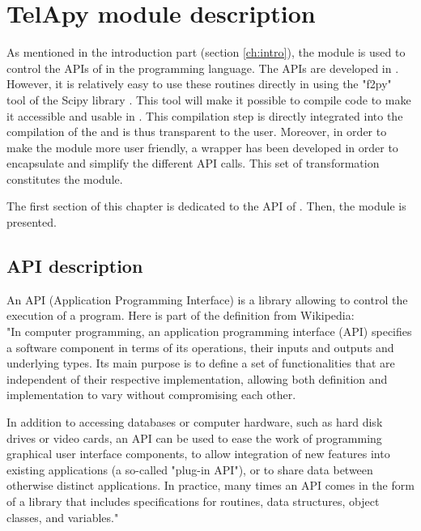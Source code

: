 \chapter{  TelApy module description}
\label{ch:TelApy_description}

As mentioned in the introduction part (section \ref{ch:intro}), the \TelApy
module is used to control the APIs of \telemacsystem in the \python programming
language. The \telemacsystem APIs are developed in \fortran. However, it is
relatively easy to use these \fortran routines directly in \python using the
"f2py" tool of the \python Scipy library \cite{Peterson2009}. This tool will
make it possible to compile \fortran code to make it accessible and usable in
\python. This compilation step is directly integrated into the compilation of
the \telemacsystem and is thus transparent to the user. Moreover, in order to
make the \TelApy module more user friendly, a \python wrapper has been developed
in order to encapsulate and simplify the different API \python calls. This set
of transformation constitutes the \TelApy module.

The first section of this chapter is dedicated to the \fortran API of
\telemacsystem. Then, the \python \TelApy module is presented.

\section{ \telemacsystem \fortran API description}
%
An API (Application Programming Interface) is a library allowing to control the
execution of a program. Here is part of the definition from Wikipedia:\\

"In computer programming, an application programming interface (API) specifies
a software component in terms of its operations, their inputs and outputs and
underlying types. Its main purpose is to define a set of functionalities that
are independent of their respective implementation, allowing both definition
and implementation to vary without compromising each other.

In addition to accessing databases or computer hardware, such as hard disk
drives or video cards, an API can be used to ease the work of programming
graphical user interface components, to allow integration of new features into
existing applications (a so-called "plug-in API"), or to share data between
otherwise distinct applications. In practice, many times an API comes in the
form of a library that includes specifications for routines, data structures,
object classes, and variables." \\

